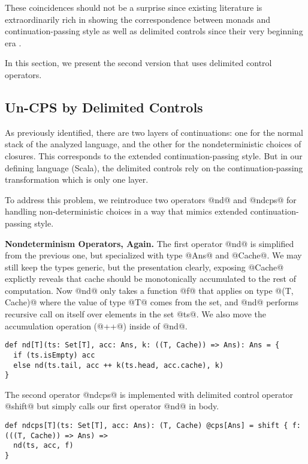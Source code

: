 \documentclass[acmsmall]{acmart}\settopmatter{}
\begin{document}
These coincidences should not be a surprise since existing literature is extraordinarily rich
in showing the correspondence between monads and continuation-passing style as well as
delimited controls since their very beginning era \cite{Danvy:1990:AC:91556.91622, wadler1992essence, danvy1992representing, moggi1991notions}.

In this section, we present the second version that uses delimited control operators.

\subsection{Un-CPS by Delimited Controls} \label{uncps}

As previously identified, there are two layers of continuations: one for the normal stack of the 
analyzed language, and the other for the nondeterministic choices of closures.
This corresponds to the extended continuation-passing style.
But in our defining language (Scala), the delimited controls rely on the continuation-passing transformation which is only one layer.

To address this problem, we reintroduce two operators @nd@ and @ndcps@ for handling non-deterministic choices
in a way that mimics extended continuation-passing style.

\textbf{Nondeterminism Operators, Again.}
The first operator @nd@ is simplified from the previous one, but specialized with type @Ans@ and @Cache@. 
We may still keep the types generic, but the presentation clearly, exposing @Cache@ explictly
reveals that cache should be monotonically accumulated to the rest of computation.
Now @nd@ only takes a function @f@ that applies on type @(T, Cache)@ where the value of type @T@ comes from the set,
and @nd@ performs recursive call on itself over elements in the set @ts@.
We also move the accumulation operation (@++@) inside of @nd@.

\begin{lstlisting}
def nd[T](ts: Set[T], acc: Ans, k: ((T, Cache)) => Ans): Ans = {
  if (ts.isEmpty) acc
  else nd(ts.tail, acc ++ k(ts.head, acc.cache), k)
}
\end{lstlisting}

The second operator @ndcps@ is implemented with delimited control operator @shift@ but simply calls our 
first operator @nd@ in body.

\begin{lstlisting}
def ndcps[T](ts: Set[T], acc: Ans): (T, Cache) @cps[Ans] = shift { f: (((T, Cache)) => Ans) =>
  nd(ts, acc, f)
}
\end{lstlisting}
\end{document}
